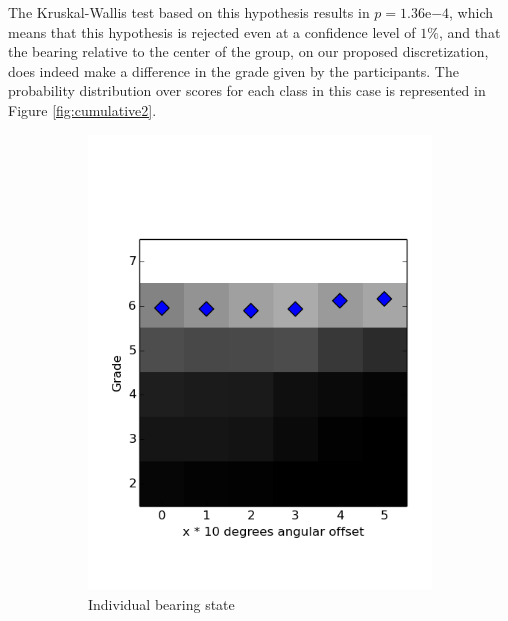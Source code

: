\documentclass[a4paper,11pt]{report}
\begin{document}
The Kruskal-Wallis test based on this hypothesis results in $p = 1.36\mathrm{e}{-4}$, which means that this hypothesis is rejected even at a confidence level of $1\%$, and that the bearing relative to the center of the group, on our proposed discretization, does indeed make a difference in the grade given by the participants. The probability distribution over scores for each class in this case is represented in Figure \ref{fig:cumulative2}.

%
%
 \begin{figure}
    \centering
    \begin{subfigure}[b]{0.45\textwidth}
        \includegraphics[width=\textwidth]{figures/grade_cumulative.png}
        \caption{Individual bearing state}
        \label{fig:cumulative1}
    \end{subfigure}
    \begin{subfigure}[b]{0.45\textwidth}

\end{subfigure}
\end{figure}
\end{document}

